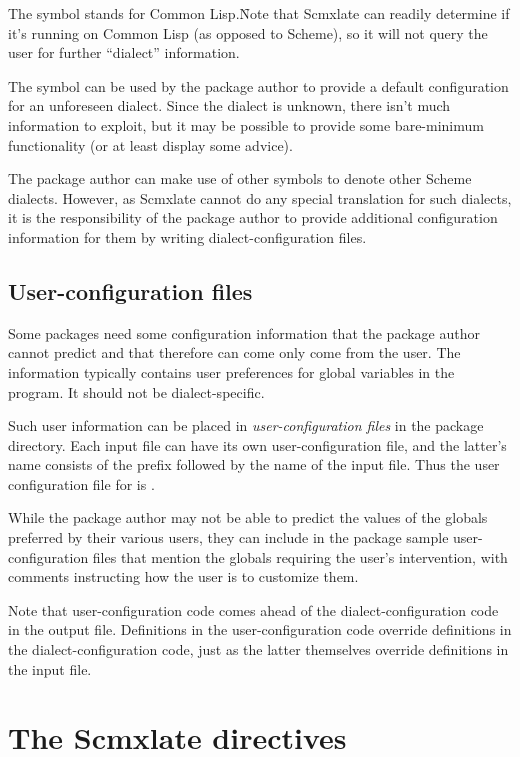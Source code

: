 The symbol  stands  for
Common Lisp.\f{Note that
Scmxlate can readily determine if it's running
on Common Lisp (as opposed to Scheme), so it will not query the user
for further ``dialect'' information.}

The symbol  can be used by the package author
to provide a default configuration for an unforeseen
dialect.  Since the dialect is unknown, there isn't
much information to exploit, but it may be
possible to provide some bare-minimum functionality
(or at least display some advice).

The package author can make use of other symbols to
denote other Scheme dialects.  However, as Scmxlate
cannot do any special translation for such dialects, it
is the responsibility of the package author to provide
additional configuration information for them by
writing dialect-configuration files.

\subsection{User-configuration files}

Some packages need some configuration information that
the package author cannot predict and that therefore
can come only come from the user.  The information
typically contains user preferences for global
variables in the program.  It should not be
dialect-specific.

Such user information can be placed in {\em
user-configuration files} in the package directory.
Each input file can have its own
user-configuration file, and the latter's name
consists of the prefix  followed by the
name of the input file.  Thus the user configuration
file for  is .

While the package author may not be able to predict the
values of the globals preferred by their various
users, they can include in the package sample
user-configuration files that mention the globals
requiring the user's intervention, with comments
instructing how the user is to customize them.

Note that user-configuration code comes ahead of the
dialect-configuration code in the output file.
Definitions in the user-configuration code override
definitions in the dialect-configuration code, just
as the latter themselves override definitions in the
input file.

\section{The Scmxlate directives}
\label{glossary}

